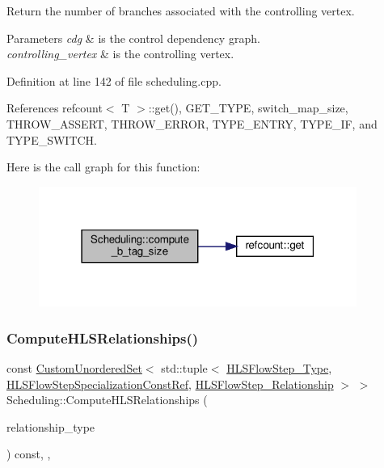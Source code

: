 Return the number of branches associated with the controlling vertex. 


\begin{DoxyParams}{Parameters}
{\em cdg} & is the control dependency graph. \\
\hline
{\em controlling\+\_\+vertex} & is the controlling vertex. \\
\hline
\end{DoxyParams}


Definition at line 142 of file scheduling.\+cpp.



References refcount$<$ T $>$\+::get(), G\+E\+T\+\_\+\+T\+Y\+PE, switch\+\_\+map\+\_\+size, T\+H\+R\+O\+W\+\_\+\+A\+S\+S\+E\+RT, T\+H\+R\+O\+W\+\_\+\+E\+R\+R\+OR, T\+Y\+P\+E\+\_\+\+E\+N\+T\+RY, T\+Y\+P\+E\+\_\+\+IF, and T\+Y\+P\+E\+\_\+\+S\+W\+I\+T\+CH.

Here is the call graph for this function\+:
\nopagebreak
\begin{figure}[H]
\begin{center}
\leavevmode
\includegraphics[width=295pt]{db/d2c/classScheduling_a3c6464c39018d94bb1965966a8b8581f_cgraph}
\end{center}
\end{figure}
\mbox{\label{classScheduling_a60e98bfbe377334ea3f3c0de2f2ab758}} 
\subsubsection{\texorpdfstring{Compute\+H\+L\+S\+Relationships()}{ComputeHLSRelationships()}}
{\footnotesize\ttfamily const \hyperlink{classCustomUnorderedSet}{Custom\+Unordered\+Set}$<$ std\+::tuple$<$ \hyperlink{hls__step_8hpp_ada16bc22905016180e26fc7e39537f8d}{H\+L\+S\+Flow\+Step\+\_\+\+Type}, \hyperlink{hls__step_8hpp_a5fdd2edf290c196531d21d68e13f0e74}{H\+L\+S\+Flow\+Step\+Specialization\+Const\+Ref}, \hyperlink{hls__step_8hpp_a3ad360b9b11e6bf0683d5562a0ceb169}{H\+L\+S\+Flow\+Step\+\_\+\+Relationship} $>$ $>$ Scheduling\+::\+Compute\+H\+L\+S\+Relationships (\begin{DoxyParamCaption}\item[{const \hyperlink{classDesignFlowStep_a723a3baf19ff2ceb77bc13e099d0b1b7}{Design\+Flow\+Step\+::\+Relationship\+Type}}]{relationship\+\_\+type }\end{DoxyParamCaption}) const\hspace{0.3cm}{\ttfamily [override]}, {\ttfamily [protected]}, {\ttfamily [virtual]}}



